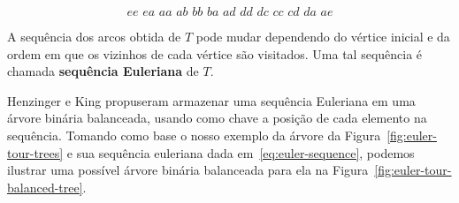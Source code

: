 \setcounter{equation}{0}
    
\begin{equation}
\textit{ee ea aa ab bb ba ad dd dc cc cd da ae}
\label{eq:euler-sequence}
\end{equation}

A sequência dos arcos obtida de $T$ pode mudar dependendo do vértice inicial e da ordem em que os vizinhos de cada vértice são visitados. Uma tal sequência é chamada \textbf{sequência Euleriana} de $T$. 

Henzinger e King \cite{henzinger_king} propuseram armazenar uma sequência Euleriana em uma árvore binária balanceada, usando como chave a posição de cada elemento na sequência. Tomando como base o nosso exemplo da árvore da Figura~\ref{fig:euler-tour-trees} e sua sequência euleriana dada em~\ref{eq:euler-sequence}, podemos ilustrar uma possível árvore binária balanceada para ela na Figura~\ref{fig:euler-tour-balanced-tree}.

